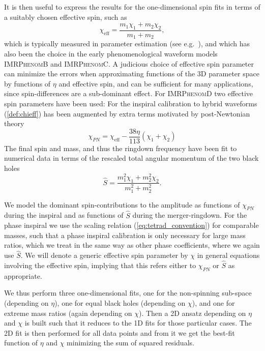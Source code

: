 \documentclass[twocolumn,prd,aps,superscriptaddress,preprintnumbers,tightenlines,showpacs,nofootinbib,eqsecnum,amsfonts,amsmath]{revtex4}
\newcommand{\phB}{\textsc{IMRPhenomB}\xspace}
\newcommand{\phC}{\textsc{IMRPhenomC}\xspace}
\newcommand{\phD}{\textsc{IMRPhenomD}\xspace}
\begin{document}
 It is then useful to express the results for the one-dimensional spin fits in terms of a suitably chosen effective spin, such as 
 \begin{equation}\label{def:chieff}
    \chi_{\mathrm{eff}}=\frac{m_1 \chi_1 + m_2 \chi_2}{m_1 + m_2}, 
 \end{equation}
 which is typically measured in parameter estimation (see e.g.~\cite{LIGOScientific:2018mvr}), and which has also been the choice in the early phenomenological waveform models \phB \cite{Ajith:2009bn} and \phC \cite{Santamaria:2010yb}.
 A judicious choice of effective spin parameter can minimize the errors when approximating functions of the 3D parameter space by functions of $\eta$ and effective spin, and can be sufficient for many applications, since spin-differences are a sub-dominant effect.
 For \phD \cite{Husa:2015iqa,Khan:2015jqa} two effective spin parameters have been used:
 For the inspiral calibration to hybrid waveforms (\ref{def:chieff}) has been augmented by extra terms motivated by post-Newtonian theory \cite{Ajith:2011ec}
 \begin{equation}\label{def:chiPN}
     \chi_{PN} =  \chi_{\mathrm{eff}} - \frac{38 \eta}{113}\left(\chi_1 + \chi_2\right) 
 \end{equation}
The final spin and mass, and thus the ringdown frequency have been fit to numerical data in terms of the rescaled total angular momentum of the two black holes 
 \begin{equation}
    \hat S = \frac{m_1^2 \chi_1 + m_2^2 \chi_2}{m_1^2 + m_2^2}.
 \end{equation}

We model the dominant spin-contributions to the amplitude as functions of $\chi_{PN}$ during the inspiral and as functions of $\hat S$ during the merger-ringdown.
For the phase inspiral we use the scaling relation (\ref{eq:tetrad_convention})
for comparable masses, such that a phase inspiral calibration is only necessary
for large mass ratios, which we treat in the same way as other phase coefficients, where we again use $\hat S$.
We will denote a generic effective spin parameter by $\chi$ in general equations involving the effective spin, implying that this refers either to $\chi_{PN}$ or $\hat S$ as appropriate.

We thus perform three
one-dimensional fits, one for the non-spinning sub-space (depending on $\eta$), one for equal black holes (depending on $\chi$), and one for extreme mass ratios (again depending on $\chi$).
%
Then a 2D ansatz depending on $\eta$ and $\chi$ is built such that it reduces to the 1D fits for those particular cases. The 2D fit is then performed for all data points and from it we get the best-fit function of $\eta$ and $\chi$ minimizing the sum of squared residuals.
 
\end{document}
